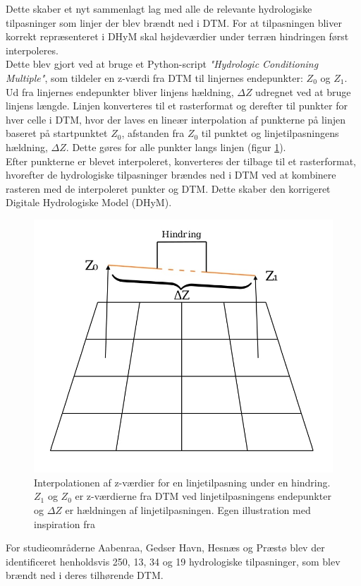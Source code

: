 Dette skaber et nyt sammenlagt lag med alle de relevante hydrologiske tilpasninger som linjer der blev brændt ned i DTM. For at tilpasningen bliver korrekt repræsenteret i DHyM skal højdeværdier under terræn hindringen først interpoleres.\\
Dette blev gjort ved at bruge et Python-script \textit{"Hydrologic Conditioning Multiple"}, som tildeler en z-værdi fra DTM til linjernes endepunkter: $Z_0$ og $Z_1$. Ud fra linjernes endepunkter bliver linjens hældning, $\Delta{Z}$ udregnet ved at bruge linjens længde. Linjen konverteres til et rasterformat og derefter til punkter for hver celle i DTM, hvor der laves en lineær interpolation af punkterne på linjen baseret på startpunktet $Z_0$, afstanden fra $Z_0$ til punktet og linjetilpasningens hældning, $\Delta{Z}$. Dette gøres for alle punkter langs linjen (figur \ref{Figur: Interpolation af Z-værdier}). \\
Efter punkterne er blevet interpoleret, konverteres der tilbage til et rasterformat, hvorefter de hydrologiske tilpasninger brændes ned i DTM ved at kombinere rasteren med de interpoleret punkter og DTM. Dette skaber den korrigeret Digitale Hydrologiske Model (DHyM).

\begin{figure}[H]
    \centering
    \includegraphics[width=0.5\linewidth]{images/metode/dtm_hydro_z.jpg}
    \caption{Interpolationen af z-værdier for en linjetilpasning under en hindring. $Z_1$ og $Z_0$ er z-værdierne fra DTM ved linjetilpasningens endepunkter og $\Delta{Z}$ er hældningen af linjetilpasningen. Egen illustration med inspiration fra \cite{balstrom_identification_2024}}
    \label{Figur: Interpolation af Z-værdier}
\end{figure}

For studieområderne Aabenraa, Gedser Havn, Hesnæs og Præstø blev der identificeret henholdsvis 250, 13, 34 og 19 hydrologiske tilpasninger, som blev brændt ned i deres tilhørende DTM.


